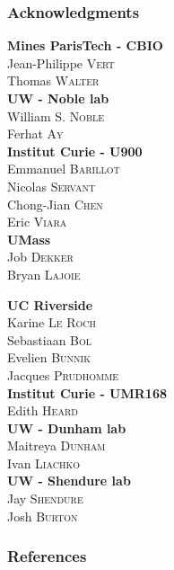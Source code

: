 \documentclass[xcolor=dvipsnames]{beamer}
\begin{document}
\begin{frame}
\frametitle{Acknowledgments}
\fboxsep=0pt
\noindent
\begin{minipage}[t]{0.48\linewidth}
\textbf{Mines ParisTech - CBIO} \\
Jean-Philippe \textsc{Vert} \\
Thomas \textsc{Walter} \\

\textbf{UW - Noble lab} \\
William S. \textsc{Noble} \\
Ferhat \textsc{Ay} \\

\textbf{Institut Curie - U900} \\
Emmanuel \textsc{Barillot} \\
Nicolas \textsc{Servant} \\
Chong-Jian \textsc{Chen} \\
Eric \textsc{Viara} \\

\textbf{UMass} \\
Job \textsc{Dekker} \\
Bryan \textsc{Lajoie} \\

\end{minipage}
\hfill%
\begin{minipage}[t]{0.48\linewidth}

\textbf{UC Riverside} \\
Karine \textsc{Le Roch} \\
Sebastiaan \textsc{Bol} \\
Evelien \textsc{Bunnik} \\
Jacques \textsc{Prudhomme} \\

\textbf{Institut Curie - UMR168} \\
Edith \textsc{Heard} \\

\textbf{UW - Dunham lab} \\
Maitreya \textsc{Dunham} \\
Ivan \textsc{Liachko} \\

\textbf{UW - Shendure lab} \\
Jay \textsc{Shendure} \\
Josh \textsc{Burton} \\

\end{minipage}

\end{frame}

\begin{frame}
  \frametitle{References}
  
  
\end{frame}
\end{document}
